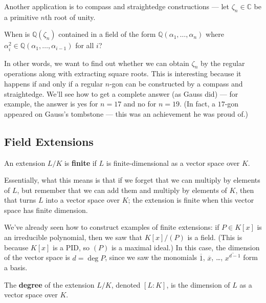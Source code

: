 Another application is to compass and straightedge constructions --- let $\zeta_n \in \mathbb{C}$ be a primitive $n$th root of unity. 

\begin{qq}
    When is $\mathbb{Q}(\zeta_n)$ contained in a field of the form $\mathbb{Q}(\alpha_1, \ldots, \alpha_n)$ where $\alpha_i^2 \in \mathbb{Q}(\alpha_1, \ldots, \alpha_{i - 1})$ for all $i$?
\end{qq}

In other words, we want to find out whether we can obtain $\zeta_n$ by the regular operations along with extracting square roots. This is interesting because it happens if and only if a regular $n$-gon can be constructed by a compass and straightedge. We'll see how to get a complete answer (as Gauss did) --- for example, the answer is yes for $n = 17$ and no for $n = 19$. (In fact, a $17$-gon appeared on Gauss's tombstone --- this was an achievement he was proud of.)

\subsection{Field Extensions}

\vspace{0.75em}

\begin{definition}
    An extension $L/K$ is \textbf{finite} if $L$ is finite-dimensional as a vector space over $K$. 
\end{definition}

Essentially, what this means is that if we forget that we can multiply by elements of $L$, but remember that we can add them and multiply by elements of $K$, then that turns $L$ into a vector space over $K$; the extension is finite when this vector space has finite dimension. 

We've already seen how to construct examples of finite extensions: if $P \in K[x]$ is an irreducible polynomial, then we saw that $K[x]/(P)$ is a field. (This is because $K[x]$ is a PID, so $(P)$ is a maximal ideal.) In this case, the dimension of the vector space is $d = \deg P$, since we saw the monomials $\overline{1}$, $\overline{x}$, \ldots, $\overline{x^{d - 1}}$ form a basis. 

\begin{definition}
    The \textbf{degree} of the extension $L/K$, denoted $[L : K]$, is the dimension of $L$ as a vector space over $K$. 
\end{definition}

